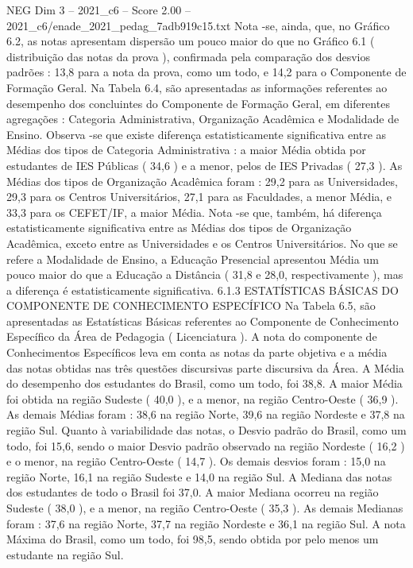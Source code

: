 \begin{textsample}{NEG Dim 3 – 2021\_c6 – Score 2.00 – 2021\_c6/enade\_2021\_pedag\_7adb919c15.txt}
Nota -se, ainda, que, no Gráfico 6.2, as notas apresentam dispersão um pouco maior do que no Gráfico 6.1 ( distribuição das notas da prova ), confirmada pela comparação dos desvios padrões : 13,8 para a nota da prova, como um todo, e 14,2 para o Componente de Formação Geral.
Na Tabela 6.4, são apresentadas as informações referentes ao desempenho dos concluintes do Componente de Formação Geral, em diferentes agregações : Categoria Administrativa, Organização Acadêmica e Modalidade de Ensino.
Observa -se que existe diferença estatisticamente significativa entre as Médias dos tipos de Categoria Administrativa : a maior Média obtida por estudantes de IES Públicas ( 34,6 ) e a menor, pelos de IES Privadas ( 27,3 ).
As Médias dos tipos de Organização Acadêmica foram : 29,2 para as Universidades, 29,3 para os Centros Universitários, 27,1 para as Faculdades, a menor Média, e 33,3 para os CEFET/IF, a maior Média.
Nota -se que, também, há diferença estatisticamente significativa entre as Médias dos tipos de Organização Acadêmica, exceto entre as Universidades e os Centros Universitários.
No que se refere a Modalidade de Ensino, a Educação Presencial apresentou Média um pouco maior do que a Educação a Distância ( 31,8 e 28,0, respectivamente ), mas a diferença é estatisticamente significativa. 6.1.3 ESTATÍSTICAS BÁSICAS DO COMPONENTE DE CONHECIMENTO ESPECÍFICO Na Tabela 6.5, são apresentadas as Estatísticas Básicas referentes ao Componente de Conhecimento Específico da Área de Pedagogia ( Licenciatura ).
A nota do componente de Conhecimentos Específicos leva em conta as notas da parte objetiva e a média das notas obtidas nas três questões discursivas parte discursiva da Área.
A Média do desempenho dos estudantes do Brasil, como um todo, foi 38,8.
A maior Média foi obtida na região Sudeste ( 40,0 ), e a menor, na região Centro-Oeste ( 36,9 ).
As demais Médias foram : 38,6 na região Norte, 39,6 na região Nordeste e 37,8 na região Sul.
Quanto à variabilidade das notas, o Desvio padrão do Brasil, como um todo, foi 15,6, sendo o maior Desvio padrão observado na região Nordeste ( 16,2 ) e o menor, na região Centro-Oeste ( 14,7 ).
Os demais desvios foram : 15,0 na região Norte, 16,1 na região Sudeste e 14,0 na região Sul.
A Mediana das notas dos estudantes de todo o Brasil foi 37,0.
A maior Mediana ocorreu na região Sudeste ( 38,0 ), e a menor, na região Centro-Oeste ( 35,3 ).
As demais Medianas foram : 37,6 na região Norte, 37,7 na região Nordeste e 36,1 na região Sul.
A nota Máxima do Brasil, como um todo, foi 98,5, sendo obtida por pelo menos um estudante na região Sul.

\end{textsample}
